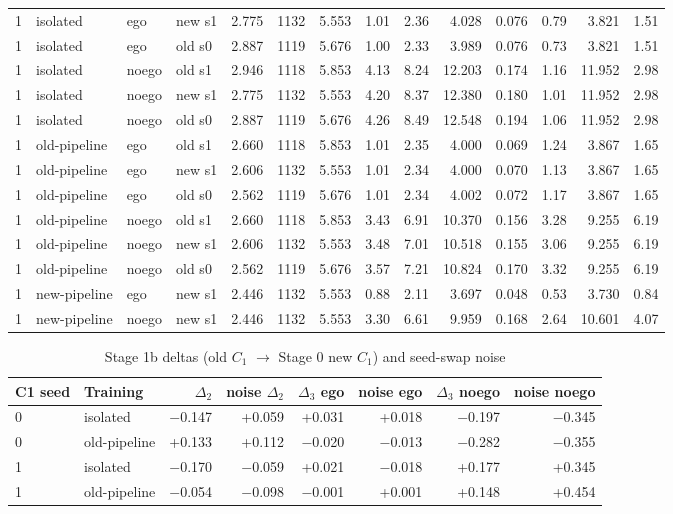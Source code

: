 \documentclass[10pt,a4paper]{article}
\begin{document}
\begin{landscape}
\begin{table}[h!]
\begin{tabular}{llllrrrrrrrrrr}
1 & isolated & ego & new s1 & 2.775 & 1132 & 5.553 & 1.01 & 2.36 & 4.028 & 0.076 & 0.79 & 3.821 & 1.51\\
1 & isolated & ego & old s0 & 2.887 & 1119 & 5.676 & 1.00 & 2.33 & 3.989 & 0.076 & 0.73 & 3.821 & 1.51\\
1 & isolated & noego & old s1 & 2.946 & 1118 & 5.853 & 4.13 & 8.24 & 12.203 & 0.174 & 1.16 & 11.952 & 2.98\\
1 & isolated & noego & new s1 & 2.775 & 1132 & 5.553 & 4.20 & 8.37 & 12.380 & 0.180 & 1.01 & 11.952 & 2.98\\
1 & isolated & noego & old s0 & 2.887 & 1119 & 5.676 & 4.26 & 8.49 & 12.548 & 0.194 & 1.06 & 11.952 & 2.98\\
\midrule
1 & old-pipeline & ego & old s1 & 2.660 & 1118 & 5.853 & 1.01 & 2.35 & 4.000 & 0.069 & 1.24 & 3.867 & 1.65\\
1 & old-pipeline & ego & new s1 & 2.606 & 1132 & 5.553 & 1.01 & 2.34 & 4.000 & 0.070 & 1.13 & 3.867 & 1.65\\
1 & old-pipeline & ego & old s0 & 2.562 & 1119 & 5.676 & 1.01 & 2.34 & 4.002 & 0.072 & 1.17 & 3.867 & 1.65\\
1 & old-pipeline & noego & old s1 & 2.660 & 1118 & 5.853 & 3.43 & 6.91 & 10.370 & 0.156 & 3.28 & 9.255 & 6.19\\
1 & old-pipeline & noego & new s1 & 2.606 & 1132 & 5.553 & 3.48 & 7.01 & 10.518 & 0.155 & 3.06 & 9.255 & 6.19\\
1 & old-pipeline & noego & old s0 & 2.562 & 1119 & 5.676 & 3.57 & 7.21 & 10.824 & 0.170 & 3.32 & 9.255 & 6.19\\
\midrule
1 & new-pipeline & ego & new s1 & 2.446 & 1132 & 5.553 & 0.88 & 2.11 & 3.697 & 0.048 & 0.53 & 3.730 & 0.84\\
1 & new-pipeline & noego & new s1 & 2.446 & 1132 & 5.553 & 3.30 & 6.61 & 9.959 & 0.168 & 2.64 & 10.601 & 4.07\\
\midrule
\bottomrule\end{tabular}\end{table}
\begin{table}[h!]\centering\small\caption{Stage 1b deltas (old $C_1$ $\rightarrow$ Stage 0 new $C_1$) and seed-swap noise}
\begin{tabular}{llrrrrrr}\toprule
C1 seed & Training & $\Delta_2$ & noise $\Delta_2$ & $\Delta_3$ ego & noise ego & $\Delta_3$ noego & noise noego\\\midrule
0 & isolated & $-$0.147 & +0.059 & +0.031 & +0.018 & $-$0.197 & $-$0.345\\
0 & old-pipeline & +0.133 & +0.112 & $-$0.020 & $-$0.013 & $-$0.282 & $-$0.355\\
1 & isolated & $-$0.170 & $-$0.059 & +0.021 & $-$0.018 & +0.177 & +0.345\\
1 & old-pipeline & $-$0.054 & $-$0.098 & $-$0.001 & +0.001 & +0.148 & +0.454\\
\bottomrule\end{tabular}\end{table}
\end{landscape}
\FloatBarrier
\end{document}
